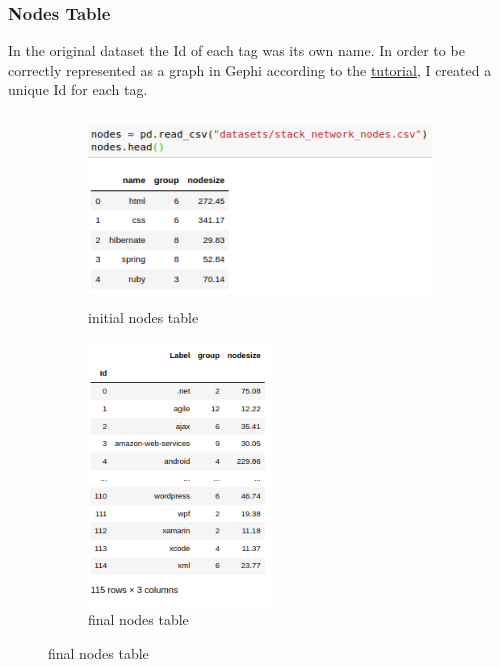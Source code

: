 \documentclass[12pt]{article}
\begin{document}
		\subsubsection{Nodes Table}
			In the original dataset the Id of each tag was its own name. In order to be correctly represented as a graph in Gephi according to the \href{https://youtu.be/HJ4Hcq3YX4k}{tutorial}, I created a unique Id for each tag. 
			\begin{figure}[ht]
				\begin{subfigure}[b]{0.5\textwidth}
					\includegraphics[width=\textwidth,height=5cm]{nodesinit}
					\caption{initial nodes table}
					\label{fig:1}
				\end{subfigure}
				\hfill 
				\begin{subfigure}[b]{0.4\textwidth}
					\includegraphics[width=\textwidth,height=7cm]{nodesfinal}
					\caption{final nodes table}
					\label{fig:2}
				\end{subfigure}
			\end{figure}
		\FloatBarrier
		
\end{document}
